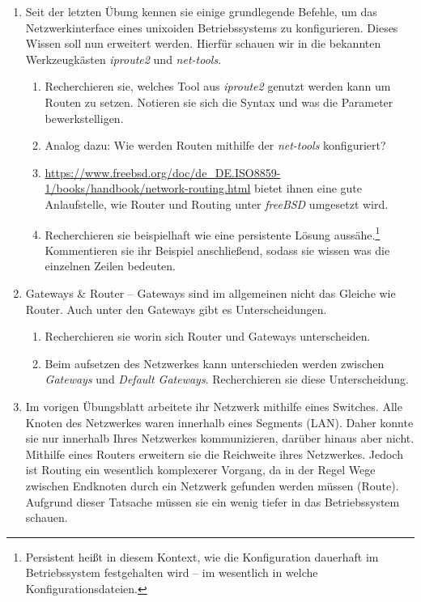 \documentclass[paper=a4,fontsize=11pt]{scrartcl}%
\numberwithin{equation}{section}
\begin{document}
\begin{enumerate}
	\item Seit der letzten Übung kennen sie einige grundlegende Befehle, um das Netzwerkinterface eines unixoiden Betriebssystems zu konfigurieren. Dieses Wissen soll nun erweitert werden. Hierfür schauen wir in die bekannten Werkzeugkästen \emph{iproute2} und \emph{net-tools}.
	\begin{enumerate}
	\item Recherchieren sie, welches Tool aus \emph{iproute2} genutzt werden kann um Routen zu setzen. Notieren sie sich die Syntax und was die Parameter bewerkstelligen.
	\item Analog dazu: Wie werden Routen mithilfe der \emph{net-tools} konfiguriert?
	\item \url{https://www.freebsd.org/doc/de_DE.ISO8859-1/books/handbook/network-routing.html} bietet ihnen eine gute Anlaufstelle, wie Router und Routing unter \emph{freeBSD} umgesetzt wird.
	\item Recherchieren sie beispielhaft wie eine persistente Lösung aussähe.\footnote{Persistent heißt in diesem Kontext, wie die Konfiguration dauerhaft im Betriebssystem festgehalten wird -- im wesentlich in welche Konfigurationsdateien.} Kommentieren sie ihr Beispiel anschließend, sodass sie wissen was die einzelnen Zeilen bedeuten.
	\end{enumerate}
	\item Gateways \& Router -- Gateways sind im allgemeinen nicht das Gleiche wie Router. Auch unter den Gateways gibt es Unterscheidungen.
	\begin{enumerate}
	\item Recherchieren sie worin sich Router und Gateways unterscheiden.
	\item Beim aufsetzen des Netzwerkes kann unterschieden werden zwischen \emph{Gateways} und \emph{Default Gateways}. Recherchieren sie diese Unterscheidung.
	\end{enumerate}
	\item Im vorigen Übungsblatt arbeitete ihr Netzwerk mithilfe eines Switches. Alle Knoten des Netzwerkes waren innerhalb eines Segments (LAN). Daher konnte sie nur innerhalb Ihres Netzwerkes kommunizieren, darüber hinaus aber nicht. Mithilfe eines Routers erweitern sie die Reichweite ihres Netzwerkes. Jedoch ist Routing ein wesentlich komplexerer Vorgang, da in der Regel Wege zwischen Endknoten durch ein Netzwerk gefunden werden müssen (Route). Aufgrund dieser Tatsache müssen sie ein wenig tiefer in das Betriebssystem schauen.

\end{enumerate}
\end{document}
